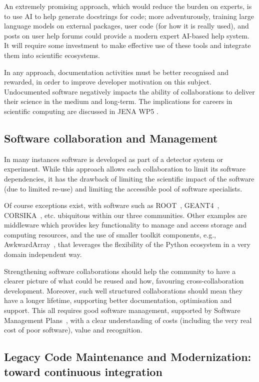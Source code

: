 An extremely promising approach, which would reduce the burden on experts, is to use AI to help generate docstrings for code; more adventurously, training large language models on external packages, user code (for how it is really used), and posts on user help forums could provide a modern expert AI-based help system. It will require some investment to make  effective use of these tools and integrate them into scientific ecosystems.

In any approach, documentation activities must be better recognised and rewarded, in order to improve developer motivation on this subject.  Undocumented software negatively impacts the ability of collaborations to deliver their science in the medium and long-term.  The implications for careers in scientific computing are discussed in JENA WP5 \cite{JENA_WG_Reports}.


\subsection{Software collaboration and Management}


In many instances software is developed as part of a detector system or experiment. While this approach allows each collaboration to limit its software dependencies, it has the drawback of limiting the scientific impact of the software (due to limited re-use) and limiting the accessible pool of software specialists.

Of course exceptions exist, with software such as ROOT~\cite{Brun1996}, GEANT4~\cite{Agostinelli2003}, CORSIKA~\cite{Heck:1998vt}, etc. ubiquitous within our three communities. Other examples are middleware which provides key functionality to manage and access storage and computing resources, and the use of smaller toolkit components, e.g., AwkwardArray~\cite{Pivarski_Awkward_Array_2018}, that leverages the flexibility of the Python ecosystem in a very domain independent way.

Strengthening software collaborations should help the community to have a clearer picture of what could be reused and how, favouring cross-collaboration development. Moreover, such well structured collaborations should mean they have a longer lifetime, supporting better documentation, optimisation and support. This all requires good software management, supported by Software Management Plans~\cite{SMPs}, with a clear understanding of costs (including the very real cost of poor software), value and recognition.


\subsection{Legacy Code Maintenance and Modernization: toward continuous integration}

